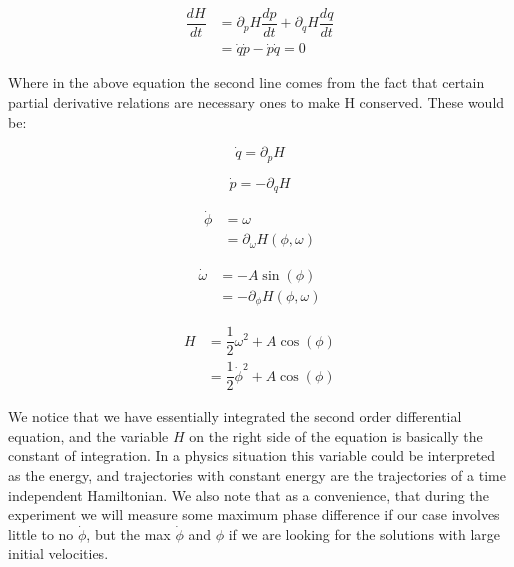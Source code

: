 \documentclass[12pt]{article}
\begin{document}
\begin{equation}
\begin{split}
\dfrac{dH}{dt} & = \partial_{p} H \dfrac{dp}{dt} +
\partial_{q} H \dfrac{dq}{dt} \\ 
& = \dot{q} \dot{p} - \dot{p} \dot{q}  = 0
\end{split}
\end{equation}

Where in the above equation the second line comes from the fact that certain partial derivative relations are necessary ones to make H conserved. These would be:

\begin{equation}
\dot{q} = \partial_{p} H
\end{equation}

\begin{equation}
\dot{p} = -\partial_{q} H
\end{equation}

\begin{equation}
\begin{split}
\dot{\phi}& = \omega \\
& = \partial_{\omega} H(\phi, \omega)
\end{split}
\end{equation}

\begin{equation}
\begin{split}
\dot{\omega}& = - A \sin(\phi) \\
& = -\partial_{\phi} H(\phi, \omega)
\end{split}
\end{equation}

\begin{equation}
\begin{split}
H & =\dfrac{1}{2} \omega^2 +  A \cos(\phi) \\
& = \dfrac{1}{2} \dot{\phi}^2 +  A \cos(\phi)
\end{split}
\end{equation}

We notice that we have essentially integrated the second order differential equation, and the variable $H$ on the right side of the equation is basically the constant of integration.  In a physics situation this variable could be interpreted as the energy, and trajectories with constant energy are the trajectories of a time independent Hamiltonian.  We also note that as a convenience, that during the experiment we will measure some maximum phase difference if our case involves little to no $\dot{\phi}$, but the max $\dot{\phi}$ and $\phi$ if we are looking for the solutions with large initial velocities.
\end{document}
